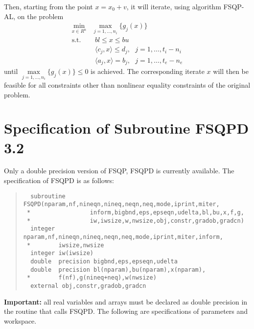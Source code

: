 \vspace{.5em}
\noindent{}Then, starting from the point $x=x_0+v$, it will iterate, 
using algorithm FSQP-AL, on the problem
\smallskip
$$\begin{array}{cl}
    \min\limits_{x\in R^n} &  \max\limits_{j=1,\ldots,n_i}\{g_j(x)\} \\
    \mbox{s.t.}  & ~~bl \leq x \leq bu\\
         & ~~\langle c_j,x\rangle \leq d_j,~~~j=1,\ldots,t_i-n_i\\
         & ~~\langle a_j,x \rangle =b_j,~~~j=1,\ldots , t_e-n_e 
            \end{array}$$
until $\max\limits_{j=1,\ldots,n_i}\{g_j(x)\} \leq 0$ is achieved.
The corresponding iterate $x$ will then be feasible 
for all constraints other than nonlinear equality constraints of 
the original problem. 

\section{Specification of Subroutine FSQPD 3.2}
\label{specs}
Only a double precision version of FSQP, FSQPD is currently available.
The specification of FSQPD is as follows:
\vspace{1em}
\begin{quote}
\begin{verbatim}
  subroutine FSQPD(nparam,nf,nineqn,nineq,neqn,neq,mode,iprint,miter,
 *                 inform,bigbnd,eps,epseqn,udelta,bl,bu,x,f,g,
 *                 iw,iwsize,w,nwsize,obj,constr,gradob,gradcn)
  integer nparam,nf,nineqn,nineq,neqn,neq,mode,iprint,miter,inform,
 *        iwsize,nwsize
  integer iw(iwsize)
  double  precision bigbnd,eps,epseqn,udelta
  double  precision bl(nparam),bu(nparam),x(nparam),
 *        f(nf),g(nineq+neq),w(nwsize)
  external obj,constr,gradob,gradcn
\end{verbatim}
\end{quote}
\vspace{1em}
{\bf Important:} all real variables and arrays must be declared as 
double precision in the routine that calls FSQPD. The following are 
specifications of parameters and workspace.

